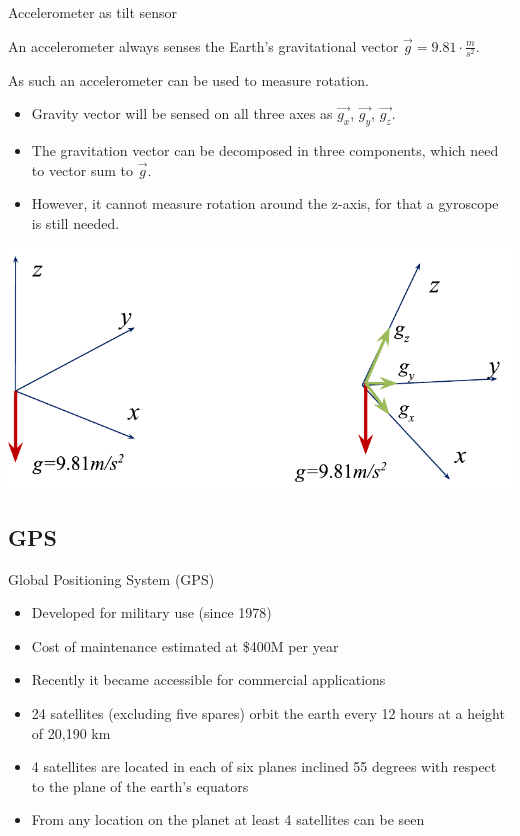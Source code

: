\documentclass[compress]{beamer}
\begin{document}
\begin{frame}{Accelerometer as tilt sensor}

An accelerometer always senses the Earth's gravitational vector $\vec{g} = 9.81\cdot\frac{m}{s^2}$.

As such an accelerometer can be used to measure rotation.

    \begin{itemize}
        \item Gravity vector will be sensed on all three axes as $\vec{g_x}$, $\vec{g_y}$, $\vec{g_z}$.

        \item The gravitation vector can be decomposed in three components, which
            need to vector sum to $\vec{g}$.

        \item However, it cannot measure rotation around the z-axis, for that a
            gyroscope is still needed.

    \end{itemize}

    \begin{center}
        \includegraphics[width=0.5\linewidth]{accelero_tilt}
    \end{center}

\end{frame}

\subsection{GPS}
\begin{frame}{Global Positioning System (GPS)}

\begin{itemize}

\item
  Developed for military use (since 1978)
\item
  Cost of maintenance estimated at \$400M per year
\item
  Recently it became accessible for commercial applications
\item
  24 satellites (excluding five spares) orbit the earth every 12 hours
  at a height of 20,190 km
\item
  4 satellites are located in each of six planes inclined 55 degrees
  with respect to the plane of the earth's equators
\item
  From any location on the planet at least 4 satellites can be seen
\end{itemize}

\end{frame}
\end{document}

